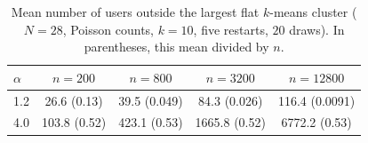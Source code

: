 \begin{table}[h]
\centering
\caption{Mean number of users outside the largest flat $k$-means cluster ($N=28$, Poisson counts, $k=10$, five restarts, $20$ draws). In parentheses, this mean divided by $n$.}\label{tab:scaling}
\begin{tabular}{lcccc}
\toprule
$\alpha$ & $n=200$ & $n=800$ & $n=3200$ & $n=12800$ \\
\midrule
1.2 & 26.6 (0.13) & 39.5 (0.049) & 84.3 (0.026) & 116.4 (0.0091) \\
4.0 & 103.8 (0.52) & 423.1 (0.53) & 1665.8 (0.52) & 6772.2 (0.53) \\
\bottomrule
\end{tabular}
\end{table}
